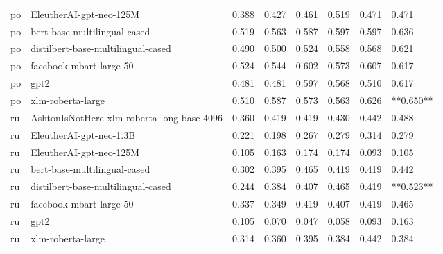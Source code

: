 \begin{tabular}{llllllll}
      po &                    EleutherAI-gpt-neo-125M & 0.388 &                     0.427 &                 0.461 &                  0.519 &                                   0.471 &     0.471 \\
      po &               bert-base-multilingual-cased & 0.519 &                     0.563 &                 0.587 &                  0.597 &                                   0.597 &     0.636 \\
      po &         distilbert-base-multilingual-cased & 0.490 &                     0.500 &                 0.524 &                  0.558 &                                   0.568 &     0.621 \\
      po &                    facebook-mbart-large-50 & 0.524 &                     0.544 &                 0.602 &                  0.573 &                                   0.607 &     0.617 \\
      po &                                       gpt2 & 0.481 &                     0.481 &                 0.597 &                  0.568 &                                   0.510 &     0.617 \\
      po &                          xlm-roberta-large & 0.510 &                     0.587 &                 0.573 &                  0.563 &                                   0.626 & **0.650** \\
      ru & AshtonIsNotHere-xlm-roberta-long-base-4096 & 0.360 &                     0.419 &                 0.419 &                  0.430 &                                   0.442 &     0.488 \\
      ru &                    EleutherAI-gpt-neo-1.3B & 0.221 &                     0.198 &                 0.267 &                  0.279 &                                   0.314 &     0.279 \\
      ru &                    EleutherAI-gpt-neo-125M & 0.105 &                     0.163 &                 0.174 &                  0.174 &                                   0.093 &     0.105 \\
      ru &               bert-base-multilingual-cased & 0.302 &                     0.395 &                 0.465 &                  0.419 &                                   0.419 &     0.442 \\
      ru &         distilbert-base-multilingual-cased & 0.244 &                     0.384 &                 0.407 &                  0.465 &                                   0.419 & **0.523** \\
      ru &                    facebook-mbart-large-50 & 0.337 &                     0.349 &                 0.419 &                  0.407 &                                   0.419 &     0.465 \\
      ru &                                       gpt2 & 0.105 &                     0.070 &                 0.047 &                  0.058 &                                   0.093 &     0.163 \\
      ru &                          xlm-roberta-large & 0.314 &                     0.360 &                 0.395 &                  0.384 &                                   0.442 &     0.384 \\
\bottomrule
\end{tabular}
